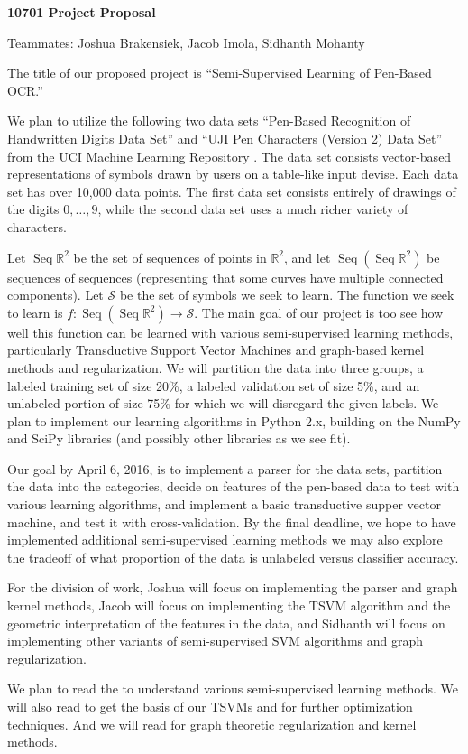 \documentclass[11pt]{article}
\begin{document}
\newcommand{\Seq}{\operatorname{Seq}}
\begin{center}
  \textbf{10701 Project Proposal}
  
Teammates: Joshua Brakensiek, Jacob Imola, Sidhanth Mohanty
\end{center}

The title of our proposed project is ``Semi-Supervised Learning of Pen-Based OCR.''

We plan to utilize the following two data sets ``Pen-Based Recognition of Handwritten Digits Data Set'' \cite{Alpaydin:1998} and  ``UJI Pen Characters (Version 2) Data Set'' \cite{Llorens:2008} from the UCI Machine Learning Repository \cite{Lichman:2013}. The data set consists vector-based representations of symbols drawn by users on a table-like input devise. Each data set has over 10,000 data points. The first data set consists entirely of drawings of the digits $0, \hdots, 9$, while the second data set uses a much richer variety of characters.

Let $\Seq \mathbb R^2$ be the set of sequences of points in $\mathbb R^2$, and let $\Seq (\Seq \mathbb R^2)$ be sequences of sequences (representing that some curves have multiple connected components). Let $\mathcal S$ be the set of symbols we seek to learn. The function we seek to learn is $f : \Seq (\Seq \mathbb R^2) \to \mathcal S$. The main goal of our project is too see how well this function can be learned with various semi-supervised learning methods, particularly Transductive Support Vector Machines and graph-based kernel methods and regularization. We will partition the data into three groups, a labeled training set of size 20\%, a labeled validation set of size 5\%, and an unlabeled portion of size 75\% for which we will disregard the given labels. We plan to implement our learning algorithms in Python 2.x, building on the NumPy and SciPy libraries (and possibly other libraries as we see fit).

Our goal by April 6, 2016, is to implement a parser for the data sets, partition the data into the categories, decide on features of the pen-based data to test with various learning algorithms, and implement a basic transductive supper vector machine, and test it with cross-validation. By the final deadline, we hope to have implemented additional semi-supervised learning methods we may also explore the tradeoff of what proportion of the data is unlabeled versus classifier accuracy.

For the division of work, Joshua will focus on implementing the parser and graph kernel methods, Jacob will focus on implementing the TSVM
algorithm and the geometric interpretation of the features in the data, and Sidhanth will focus on implementing other variants of semi-supervised
SVM algorithms and graph regularization. 

We plan to read the \cite{Zhu:2005} to understand various semi-supervised learning methods. We will also read \cite{chapelle2006continuation}
to get the basis of our TSVMs and \cite{chapelle2008optimization} for further optimization techniques. And we will read \cite{smola2003kernels}
for graph theoretic regularization and kernel methods.



\end{document}
